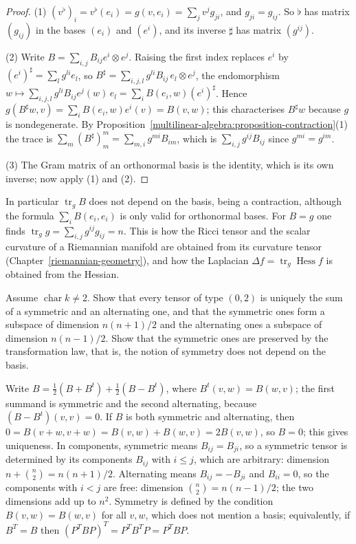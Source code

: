 \begin{proof}
(1) $(v^\flat)_i = v^\flat(e_i) = g(v, e_i) = \sum_jv^jg_{ji}$, and $g_{ji} = g_{ij}$. So $\flat$ has matrix $(g_{ij})$ in the bases $(e_i)$ and $(e^i)$, and its inverse $\sharp$ has matrix $(g^{ij})$.

(2) Write $B = \sum_{i,j}B_{ij}e^i \otimes e^j$. Raising the first index replaces $e^i$ by $(e^i)^\sharp = \sum_lg^{li}e_l$, so $B^\sharp = \sum_{i,j,l}g^{li}B_{ij}\,e_l \otimes e^j$, the endomorphism
$w \mapsto \sum_{i,j,l}g^{li}B_{ij}e^j(w)\,e_l = \sum_iB(e_i, w)(e^i)^\sharp$. Hence $g(B^\sharp w, v) = \sum_iB(e_i, w)e^i(v) = B(v, w)$; this characterises $B^\sharp w$ because $g$ is nondegenerate. By
Proposition~\ref{multilinear-algebra:proposition-contraction}(1) the trace is $\sum_m(B^\sharp)^m_m = \sum_{m,i}g^{mi}B_{im}$, which is $\sum_{i,j}g^{ij}B_{ij}$ since $g^{mi} = g^{im}$.

(3) The Gram matrix of an orthonormal basis is the identity, which is its own inverse; now apply (1) and (2).
\end{proof}

In particular $\operatorname{tr}_gB$ does not depend on the basis, being a contraction, although the formula $\sum_iB(e_i, e_i)$ is only valid for orthonormal bases. For $B = g$ one finds
$\operatorname{tr}_gg = \sum_{i,j}g^{ij}g_{ij} = n$. This is how the Ricci tensor and the scalar curvature of a Riemannian manifold are obtained from its curvature tensor
(Chapter~\ref{riemannian-geometry}), and how the Laplacian $\Delta f = \operatorname{tr}_g\operatorname{Hess}f$ is obtained from the Hessian.

\begin{exercise}\label{multilinear-algebra:exercise-tensor-symmetric}
Assume $\operatorname{char}k \neq 2$. Show that every tensor of type $(0,2)$ is uniquely the sum of a symmetric and an alternating one, and that the symmetric ones form a subspace of dimension
$n(n+1)/2$ and the alternating ones a subspace of dimension $n(n-1)/2$. Show that the symmetric ones are preserved by the transformation law, that is, the notion of symmetry does not depend on
the basis.
\end{exercise}

\begin{solution}
Write $B = \frac12(B + B^t) + \frac12(B - B^t)$, where $B^t(v, w) = B(w, v)$; the first summand is symmetric and the second alternating, because $(B - B^t)(v, v) = 0$. If $B$ is both symmetric and
alternating, then $0 = B(v + w, v + w) = B(v, w) + B(w, v) = 2B(v, w)$, so $B = 0$; this gives uniqueness. In components, symmetric means $B_{ij} = B_{ji}$, so a symmetric tensor is determined by
its components $B_{ij}$ with $i \leq j$, which are arbitrary: dimension $n + \binom n2 = n(n+1)/2$. Alternating means $B_{ij} = -B_{ji}$ and $B_{ii} = 0$, so the components with $i < j$
are free: dimension $\binom n2 = n(n-1)/2$; the two dimensions add up to $n^2$. Symmetry is defined by the condition $B(v, w) = B(w, v)$ for all $v, w$, which does not mention a basis; equivalently,
if $B^T = B$ then $(P^TBP)^T = P^TB^TP = P^TBP$.
\end{solution}

